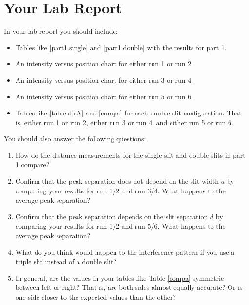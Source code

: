 \section{Your Lab Report}
In your lab report you should include:
\begin{itemize}
	\item Tables like \ref{part1.single} and \ref{part1.double} with the results for part 1.
	\item An intensity versus position chart for either run 1 or run 2.
	\item An intensity versus position chart for either run 3 or run 4.
	\item An intensity versus position chart for either run 5 or run 6.
	\item Tables like \ref{table.disA} and \ref{compa} for each double slit configuration. That is, either run 1 or run 2, either run 3 or run 4, and either run 5 or run 6. 
\end{itemize}
You should also answer the following questions:
\begin{enumerate}
	\item How do the distance measurements for the single slit and double slits in part 1 compare?
	\item Confirm that the peak separation does not depend on the slit width $a$ by comparing your results for run 1/2 and run 3/4. What happens to the average peak separation?
	\item Confirm that the peak separation depends on the slit separation $d$ by comparing your results for run 1/2 and run 5/6. What happens to the average peak separation?
	\item What do you think would happen to the interference pattern if you use a triple slit instead of a double slit?
	\item In general, are the values in your tables like Table \ref{compa} symmetric between left or right? That is, are both sides almost equally accurate? Or is one side closer to the expected values than the other?
\end{enumerate}
\newpage
